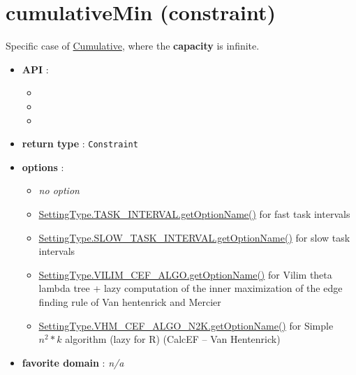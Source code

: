 \section{cumulativeMin (constraint)}\label{cumulativemin:cumulativeminconstraint}\hypertarget{cumulativemin:cumulativeminconstraint}{}
Specific case of \hyperlink{cumulative:cumulativeconstraint}{Cumulative}, where the \textbf{capacity} is infinite.

\begin{itemize}
	\item \textbf{API} :
	\begin{itemize}
		\item {}
		\item {}
		\item {}
	\end{itemize}
	\item \textbf{return type} : \texttt{Constraint}
	\item \textbf{options} :
	\begin{itemize}
		\item \emph{no option}
		\item \hyperlink{ccumulativeti:ccumulativetioptions}{SettingType.TASK\_INTERVAL.getOptionName()} for fast task intervals
		\item \hyperlink{ccumulativesti:ccumulativestioptions}{SettingType.SLOW\_TASK\_INTERVAL.getOptionName()} for slow task intervals
		\item \hyperlink{ccumulativecef:ccumulativecefoptions}{SettingType.VILIM\_CEF\_ALGO.getOptionName()} for Vilim theta lambda tree + lazy computation of the inner maximization of the edge finding rule of Van hentenrick and Mercier
		\item \hyperlink{ccumulativescef:ccumulativescefoptions}{SettingType.VHM\_CEF\_ALGO\_N2K.getOptionName()} for Simple $n^2 * k$ algorithm (lazy for R) (CalcEF -- Van Hentenrick)
	\end{itemize}
	\item \textbf{favorite domain} : \emph{n/a}
\end{itemize}